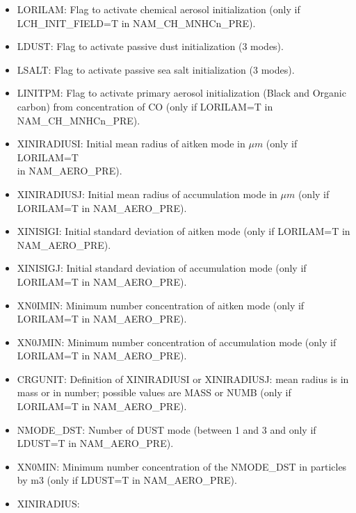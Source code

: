 \begin{itemize}
\item LORILAM:
Flag to activate  chemical aerosol initialization (only if LCH\_INIT\_FIELD=T in NAM\_CH\_MNHCn\_PRE).
\item LDUST: 
Flag to activate  passive dust initialization (3 modes).
\item LSALT: 
Flag to activate  passive sea salt initialization (3 modes).
\item LINITPM:
Flag to activate  primary aerosol initialization (Black and Organic carbon) from concentration of CO (only if LORILAM=T in NAM\_CH\_MNHCn\_PRE).
\item XINIRADIUSI:
Initial mean radius of aitken mode in $\mu m$  (only if LORILAM=T \\
in NAM\_AERO\_PRE).
\item XINIRADIUSJ:
Initial mean radius of accumulation mode in $\mu m$ (only if LORILAM=T in NAM\_AERO\_PRE).
\item XINISIGI:
Initial standard deviation of aitken  mode (only if LORILAM=T in NAM\_AERO\_PRE).
\item XINISIGJ:
Initial standard deviation of accumulation  mode (only if LORILAM=T in NAM\_AERO\_PRE).
\item XN0IMIN:
Minimum number concentration of aitken mode (only if LORILAM=T in NAM\_AERO\_PRE).
\item XN0JMIN:
Minimum number concentration of accumulation mode (only if LORILAM=T in NAM\_AERO\_PRE).
\item CRGUNIT:
Definition of XINIRADIUSI or XINIRADIUSJ: mean radius is in mass or in number; possible values are MASS or NUMB (only if LORILAM=T in NAM\_AERO\_PRE).
\item NMODE\_DST:
Number of DUST mode (between 1 and 3 and only if LDUST=T in NAM\_AERO\_PRE).
\item XN0MIN:
Minimum number concentration of the NMODE\_DST in particles by m3 (only if LDUST=T in NAM\_AERO\_PRE).
\item XINIRADIUS:

\end{itemize}
